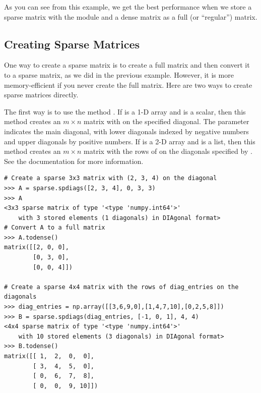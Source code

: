 As you can see from this example, we get the best performance when we store a sparse matrix with the  module and a dense matrix as a full (or ``regular'') matrix.

\subsection*{Creating Sparse Matrices}
One way to create a sparse matrix is to create a full matrix and then convert it to a sparse matrix, as we did in the previous example. However, it is more memory-efficient if you never create the full matrix. Here are two ways to create sparse matrices directly.

The first way is to use the method . If  is a 1-D array and  is a scalar, then this method creates an $m \times n$ matrix with  on the specified diagonal. The parameter  indicates the main diagonal, with lower diagonals indexed by negative numbers and upper diagonals by positive numbers. If  is a 2-D array and  is a list, then this method creates an $m \times n$ matrix with the rows of  on the diagonals specified by . See the documentation for more information.
\begin{lstlisting}
# Create a sparse 3x3 matrix with (2, 3, 4) on the diagonal
>>> A = sparse.spdiags([2, 3, 4], 0, 3, 3)
>>> A
<3x3 sparse matrix of type '<type 'numpy.int64'>'
	with 3 stored elements (1 diagonals) in DIAgonal format>
# Convert A to a full matrix
>>> A.todense()
matrix([[2, 0, 0],
        [0, 3, 0],
        [0, 0, 4]])
	
# Create a sparse 4x4 matrix with the rows of diag_entries on the diagonals
>>> diag_entries = np.array([[3,6,9,0],[1,4,7,10],[0,2,5,8]])
>>> B = sparse.spdiags(diag_entries, [-1, 0, 1], 4, 4)
<4x4 sparse matrix of type '<type 'numpy.int64'>'
	with 10 stored elements (3 diagonals) in DIAgonal format>
>>> B.todense()
matrix([[ 1,  2,  0,  0],
        [ 3,  4,  5,  0],
        [ 0,  6,  7,  8],
        [ 0,  0,  9, 10]])
\end{lstlisting}

